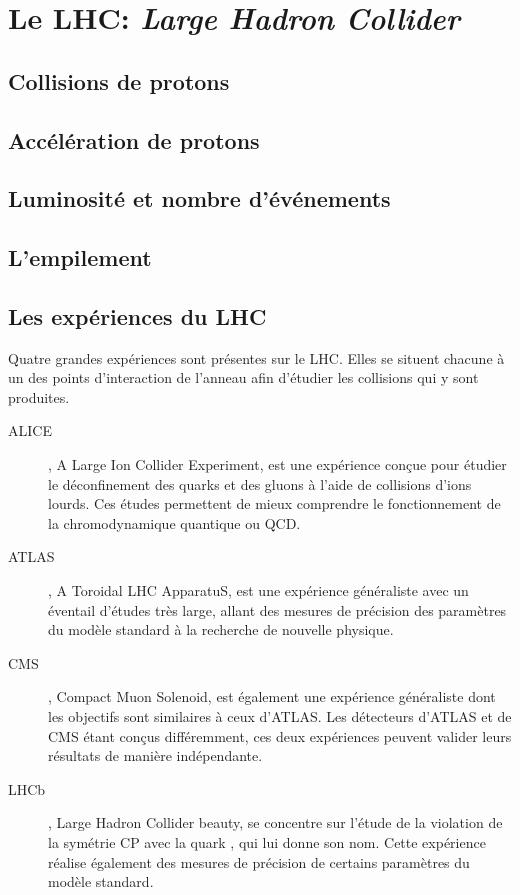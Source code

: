 \section{Le LHC: \emph{Large Hadron Collider}}

\subsection{Collisions de protons}

\subsection{Accélération de protons}

\subsection{Luminosité et nombre d'événements}

\subsection{L'empilement}

\subsection{Les expériences du LHC}
Quatre grandes expériences sont présentes sur le LHC. Elles se situent chacune à un des points d'interaction de l'anneau afin d'étudier les collisions qui y sont produites.
\begin{description}
\item[ALICE]\cite{alice_paper}, A Large Ion Collider Experiment, est une expérience conçue pour étudier le déconfinement des quarks et des gluons à l'aide de collisions d'ions lourds. Ces études permettent de mieux comprendre le fonctionnement de la chromodynamique quantique ou QCD.
\item[ATLAS]\cite{atlas_paper}, A Toroidal LHC ApparatuS, est une expérience généraliste avec un éventail d'études très large, allant des mesures de précision des paramètres du modèle standard à la recherche de nouvelle physique.
\item[CMS]\cite{cms_paper}, Compact Muon Solenoid, est également une expérience généraliste dont les objectifs sont similaires à ceux d'ATLAS. Les détecteurs d'ATLAS et de CMS étant conçus différemment, ces deux expériences peuvent valider leurs résultats de manière indépendante.
\item[LHCb]\cite{lhcb_paper}, Large Hadron Collider beauty, se concentre sur l'étude de la violation de la symétrie CP avec la quark \quarkb, qui lui donne son nom. Cette expérience réalise également des mesures de précision de certains paramètres du modèle standard.
\end{description}